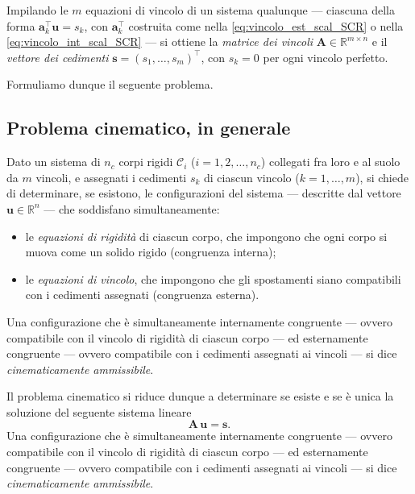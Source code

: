 \medskip

Impilando le $m$ equazioni di vincolo di un sistema qualunque ---
ciascuna della forma $\bm{a}_k^\top\bm{u}=s_k$, con $\bm{a}_k^\top$
costruita come nella \eqref{eq:vincolo_est_scal_SCR} o nella
\eqref{eq:vincolo_int_scal_SCR} --- si ottiene la \emph{matrice dei
	vincoli} $\bm{A}\in\mathbb{R}^{m\times n}$
e il \emph{vettore dei cedimenti}
$\bm{s}=(s_1,\dots,s_m)^\top$, con $s_k=0$ per ogni vincolo perfetto.

Formuliamo dunque il seguente problema.

\subsection{Problema cinematico, in generale}
Dato un sistema di $n_c$ corpi rigidi $\mathcal{C}_i$
($i = 1, 2, \dots, n_c$) collegati fra loro e al suolo
da $m$ vincoli, e assegnati i cedimenti $s_k$ di ciascun
vincolo ($k = 1, \dots, m$), si chiede di determinare,
se esistono, le configurazioni del sistema --- descritte
dal vettore $\bm{u} \in \mathbb{R}^n$ --- che soddisfano
simultaneamente:
\begin{itemize}[noitemsep]
	\item le \emph{equazioni di rigidità} di ciascun corpo,	che impongono che ogni corpo si muova come un solido
	rigido (congruenza interna);
	\item le \emph{equazioni di vincolo}, che impongono che	gli spostamenti siano compatibili con i cedimenti
	assegnati (congruenza esterna).
\end{itemize}
Una configurazione che è simultaneamente internamente
congruente --- ovvero compatibile con il vincolo di
rigidità di ciascun corpo --- ed esternamente congruente
--- ovvero compatibile con i cedimenti assegnati ai
vincoli --- si dice \emph{cinematicamente ammissibile}.

Il problema cinematico si riduce dunque a determinare se esiste e se è unica la soluzione del seguente sistema lineare
 \begin{equation}\label{eq:prob_cin_SCR}
 	\bm{A}\,\bm{u} = \bm{s}.
 \end{equation}
 Una configurazione che è simultaneamente internamente
 congruente --- ovvero compatibile con il vincolo di
 rigidità di ciascun corpo --- ed esternamente congruente
 --- ovvero compatibile con i cedimenti assegnati ai
 vincoli --- si dice \emph{cinematicamente ammissibile}.




